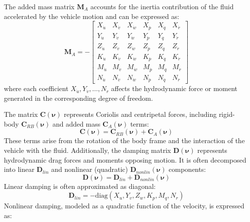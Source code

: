 The added mass matrix $\mathbf{M}_A$ accounts for the inertia contribution of the fluid accelerated by the vehicle motion and can be expressed as:
\begin{equation}
    \mathbf{M}_{A} = -
    \begin{bmatrix}
        X_{\dot{u}} & X_{\dot{v}} & X_{\dot{w}} & X_{\dot{p}} & X_{\dot{q}} & X_{\dot{r}} \\
        Y_{\dot{u}} & Y_{\dot{v}} & Y_{\dot{w}} & Y_{\dot{p}} & Y_{\dot{q}} & Y_{\dot{r}} \\
        Z_{\dot{u}} & Z_{\dot{v}} & Z_{\dot{w}} & Z_{\dot{p}} & Z_{\dot{q}} & Z_{\dot{r}} \\
        K_{\dot{u}} & K_{\dot{v}} & K_{\dot{w}} & K_{\dot{p}} & K_{\dot{q}} & K_{\dot{r}} \\
        M_{\dot{u}} & M_{\dot{v}} & M_{\dot{w}} & M_{\dot{p}} & M_{\dot{q}} & M_{\dot{r}} \\
        N_{\dot{u}} & N_{\dot{v}} & N_{\dot{w}} & N_{\dot{p}} & N_{\dot{q}} & N_{\dot{r}}
    \end{bmatrix}
\end{equation}
where each coefficient $X_{\dot{u}}, Y_{\dot{v}}, \ldots, N_{\dot{r}}$ affects the hydrodynamic force or moment generated in the corresponding degree of freedom.

The matrix $\mathbf{C}(\boldsymbol{\nu})$ represents Coriolis and centripetal forces, including rigid-body $\mathbf{C}_{RB}(\boldsymbol{\nu})$ and added mass $\mathbf{C}_A(\boldsymbol{\nu})$ terms:
\begin{equation}
    \mathbf{C}(\boldsymbol{\nu}) = \mathbf{C}_{RB}(\boldsymbol{\nu}) + \mathbf{C}_A(\boldsymbol{\nu})
\end{equation}
These terms arise from the rotation of the body frame and the interaction of the vehicle with the fluid. Additionally, the damping matrix $\mathbf{D}(\boldsymbol{\nu})$ represents hydrodynamic drag forces and moments opposing motion. It is often decomposed into linear $\mathbf{D}_{lin}$ and nonlinear (quadratic) $\mathbf{D}_{nonlin}(\boldsymbol{\nu})$ components:
\begin{equation}
    \mathbf{D}(\boldsymbol{\nu}) = \mathbf{D}_{lin} + \mathbf{D}_{nonlin}(\boldsymbol{\nu})
\end{equation}
Linear damping is often approximated as diagonal:
\begin{equation}
    \mathbf{D}_{lin} = -\text{diag}(X_u, Y_v, Z_w, K_p, M_q, N_r)
\end{equation}
Nonlinear damping, modeled as a quadratic function of the velocity, is expressed as:



